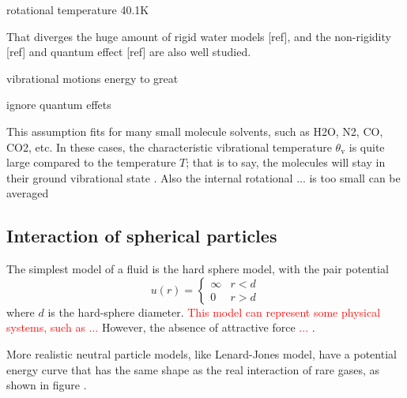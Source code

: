 rotational temperature 40.1K

That diverges the huge amount of rigid water models {[}ref{]}, and
the non-rigidity {[}ref{]} and quantum effect {[}ref{]} are also well
studied.

vibrational motions energy to great 

ignore quantum effets

This assumption fits for many small molecule solvents, such as H2O,
N2, CO, CO2, etc. In these cases, the characteristic vibrational temperature
$\theta_{\mathrm{v}}$ is quite large compared to the temperature
$T$; that is to say, the molecules will stay in their ground vibrational
state \citep{Gray-Gubbins}. Also the internal rotational ... is too
small can be averaged


\subsection{Interaction of spherical particles}

The simplest model of a fluid is the hard sphere model, with the pair
potential
\begin{equation}
u(r)=\begin{cases}
\infty & r<d\\
0 & r>d
\end{cases}
\end{equation}
where $d$ is the hard-sphere diameter. \textcolor{red}{This model
can represent some physical systems, such as ... }However, the absence
of attractive force \textcolor{red}{...} .

More realistic neutral particle models, like Lenard-Jones model, have
a potential energy curve that has the same shape as the real interaction
of rare gases, as shown in figure .

